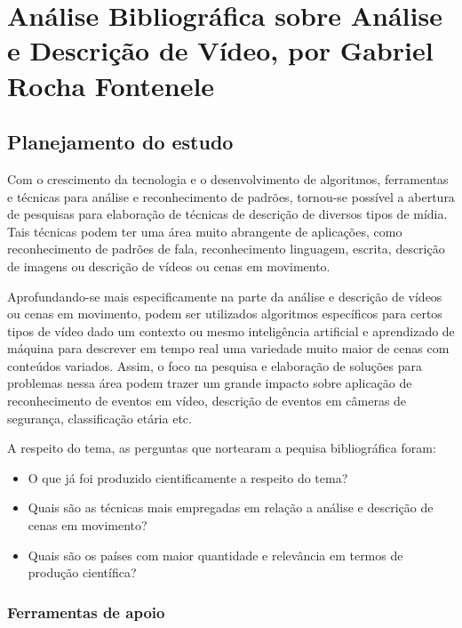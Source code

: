 \chapter{Análise Bibliográfica sobre Análise e Descrição de Vídeo, por Gabriel Rocha Fontenele\label{chap:bibliometria:ngsylar}}

\section{Planejamento do estudo}

Com o crescimento da tecnologia e o desenvolvimento de algoritmos, ferramentas e técnicas para análise e reconhecimento de padrões, tornou-se possível a abertura de pesquisas para elaboração de técnicas de descrição de diversos tipos de mídia. Tais técnicas podem ter uma área muito abrangente de aplicações, como reconhecimento de padrões de fala, reconhecimento linguagem, escrita, descrição de imagens ou descrição de vídeos ou cenas em movimento.

Aprofundando-se mais especificamente na parte da análise e descrição de vídeos ou cenas em movimento, podem ser utilizados algoritmos específicos para certos tipos de vídeo dado um contexto ou mesmo inteligência artificial e aprendizado de máquina para descrever em tempo real uma variedade muito maior de cenas com conteúdos variados. Assim, o foco na pesquisa e elaboração de soluções para problemas nessa área podem trazer um grande impacto sobre aplicação de reconhecimento de eventos em vídeo, descrição de eventos em câmeras de segurança, classificação etária etc.

A respeito do tema, as perguntas que nortearam a pequisa bibliográfica foram:

\begin{itemize}

\item O que já foi produzido cientificamente a respeito do tema?
\item Quais são as técnicas mais empregadas em relação a análise e descrição de cenas em movimento?
\item Quais são os países com maior quantidade e relevância em termos de produção científica?

\end{itemize}


\subsection{Ferramentas de apoio}

